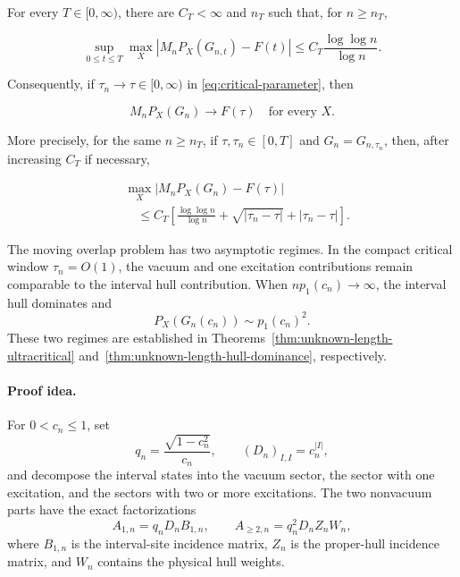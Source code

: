 \begin{theorem}
\label{thm:unknown-length-ultracritical}
For every \(T\in[0,\infty)\), there are \(C_T<\infty\) and \(n_T\) such that,
for \(n\ge n_T\),

\begin{equation}\label{eq:critical-uniform-rate}
 \sup_{0\le t\le T}
 \max_X
 \left|M_nP_X(G_{n,t})-F(t)\right|
 \le C_T\frac{\log\log n}{\log n}.
\end{equation}

Consequently, if \(\tau_n\to\tau\in[0,\infty)\) in
\eqref{eq:critical-parameter}, then

\begin{equation}\label{eq:critical-common-limit}
 M_nP_X(G_n)\longrightarrow F(\tau)
 \quad\text{for every }X.
\end{equation}

More precisely, for the same \(n\ge n_T\), if
\(\tau,\tau_n\in[0,T]\) and \(G_n=G_{n,\tau_n}\), then, after increasing
\(C_T\) if necessary,

\begin{equation}\label{eq:critical-centered-rate}
 \begin{aligned}
 &\max_X\left|M_nP_X(G_n)-F(\tau)\right|\\[-0.3ex]
 &\quad\le C_T\left[
 \frac{\log\log n}{\log n}
 +\sqrt{|\tau_n-\tau|}
 +|\tau_n-\tau|
 \right].
 \end{aligned}
\end{equation}
\end{theorem}

The moving overlap problem has two asymptotic regimes. In the compact
critical window \(\tau_n=O(1)\), the vacuum and one excitation
contributions remain comparable to the interval hull contribution. When
\(n p_1(c_n)\to\infty\), the interval hull dominates and
\[
P_X(G_n(c_n))\sim p_1(c_n)^2.
\]
These two regimes are established in
Theorems~\ref{thm:unknown-length-ultracritical}
and~\ref{thm:unknown-length-hull-dominance}, respectively.

\paragraph{Proof idea.}
For \(0<c_n\leq1\), set
\[
q_n=\frac{\sqrt{1-c_n^2}}{c_n},
\qquad
(D_n)_{I,I}=c_n^{|I|},
\]
and decompose the interval states into the vacuum sector, the sector with one
excitation, and the sectors with two or more excitations. The two nonvacuum
parts have the exact factorizations
\begin{equation}\label{eq:critical-sector-factorization}
A_{1,n}=q_nD_nB_{1,n},
\qquad
A_{\geq2,n}=q_n^2D_nZ_nW_n,
\end{equation}
where \(B_{1,n}\) is the interval-site incidence matrix, \(Z_n\) is the
proper-hull incidence matrix, and \(W_n\) contains the physical hull weights.


